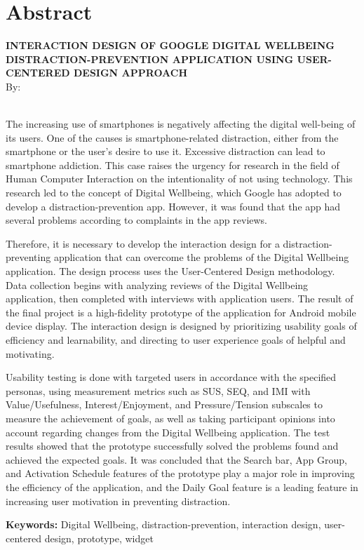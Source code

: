\clearpage
\chapter*{Abstract}

\begin{center}
  \textbf{\MakeUppercase{Interaction Design of Google Digital Wellbeing Distraction-Prevention Application using User-Centered Design Approach}} \\[1em]
  
  By: \\
  \MakeUppercase{\theauthor} \\

\end{center}

\begin{singlespace}
  The increasing use of smartphones is negatively affecting the digital well-being of its users. One of the causes is smartphone-related distraction, either from the smartphone or the user's desire to use it. Excessive distraction can lead to smartphone addiction. This case raises the urgency for research in the field of Human Computer Interaction on the intentionality of not using technology. This research led to the concept of Digital Wellbeing, which Google has adopted to develop a distraction-prevention app. However, it was found that the app had several problems according to complaints in the app reviews.

  Therefore, it is necessary to develop the interaction design for a distraction-preventing application that can overcome the problems of the Digital Wellbeing application. The design process uses the User-Centered Design methodology. Data collection begins with analyzing reviews of the Digital Wellbeing application, then completed with interviews with application users. The result of the final project is a high-fidelity prototype of the application for Android mobile device display. The interaction design is designed by prioritizing usability goals of efficiency and learnability, and directing to user experience goals of helpful and motivating.

  Usability testing is done with targeted users in accordance with the specified personas, using measurement metrics such as SUS, SEQ, and IMI with Value/Usefulness, Interest/Enjoyment, and Pressure/Tension subscales to measure the achievement of goals, as well as taking participant opinions into account regarding changes from the Digital Wellbeing application. The test results showed that the prototype successfully solved the problems found and achieved the expected goals. It was concluded that the Search bar, App Group, and Activation Schedule features of the prototype play a major role in improving the efficiency of the application, and the Daily Goal feature is a leading feature in increasing user motivation in preventing distraction.

  \noindent \textbf{Keywords:} Digital Wellbeing, distraction-prevention, interaction design, user-centered design, prototype, widget

\end{singlespace}
